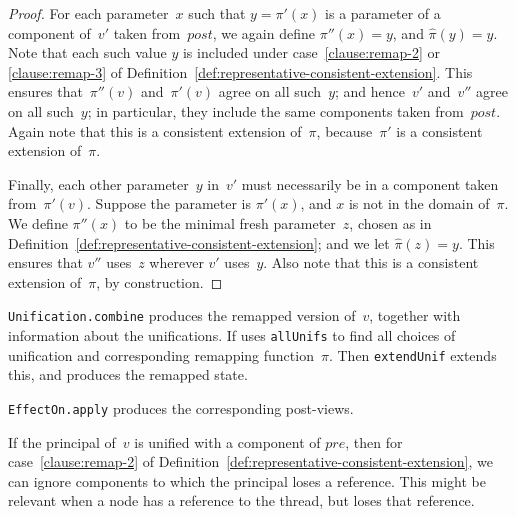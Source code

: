 \begin{proof}
For each parameter~$x$ such that $y = \pi'(x)$ is a parameter of a component
of~$v'$ taken from~$post$, we again define $\pi''(x) = y$, and $\hat\pi(y) =
y$.  Note that each such value $y$ is included under
case~\ref{clause:remap-2} or \ref{clause:remap-3} of
Definition~\ref{def:representative-consistent-extension}.  This ensures
that~$\pi''(v)$ and~$\pi'(v)$ agree on all such~$y$; and hence~$v'$ and~$v''$
agree on all such~$y$; in particular, they include the same components taken
from~$post$.  Again note that this is a consistent extension of~$\pi$,
because~$\pi'$ is a consistent extension of~$\pi$. 

Finally, each other parameter~$y$ in~$v'$ must necessarily be in a component
taken from~$\pi'(v)$.  Suppose the parameter is $\pi'(x)$, and $x$ is not in
the domain of~$\pi$.  We define $\pi''(x)$ to be the minimal fresh
parameter~$z$, chosen as in
Definition~\ref{def:representative-consistent-extension}; and we let
$\hat\pi(z) = y$.  This ensures that $v''$ uses~$z$ wherever $v'$ uses~$y$.
Also note that this is a consistent extension of~$\pi$, by construction.
\end{proof}


\begin{impNote}
\texttt{Unification.combine} produces the remapped version of~$v$, together
with information about the unifications.  If uses \texttt{allUnifs} to find
all choices of unification and corresponding remapping function~$\pi$.  Then
\texttt{extendUnif} extends this, and produces the remapped state.

\texttt{EffectOn.apply} produces the corresponding post-views.
\end{impNote}


\begin{improve} 
If the principal of~$v$ is unified with a component of $pre$, then for
case~\ref{clause:remap-2} of
Definition~\ref{def:representative-consistent-extension}, we can ignore
components to which the principal loses a reference.  This might be relevant
when a node has a reference to the thread, but loses that reference. 
\end{improve}


